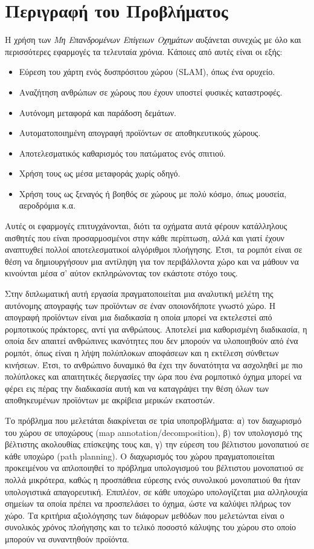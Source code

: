 \section{Περιγραφή του Προβλήματος}
\label{section:problem_description}

Η χρήση των \emph{Μη Επανδρομένων Επίγειων Οχημάτων} αυξάνεται συνεχώς με όλο και περισσότερες εφαρμογές τα τελευταία χρόνια. Κάποιες από αυτές είναι οι εξής:
\begin{itemize}
    \setlength\itemsep{-0.2em}
    \item Εύρεση του χάρτη ενός δυσπρόσιτου χώρου (SLAM), όπως ένα ορυχείο.
    \item Αναζήτηση ανθρώπων σε χώρους που έχουν υποστεί φυσικές καταστροφές.
    \item Αυτόνομη μεταφορά και παράδοση δεμάτων.
    \item Αυτοματοποιημένη απογραφή προϊόντων σε αποθηκευτικούς χώρους.
    \item Αποτελεσματικός καθαρισμός του πατώματος ενός σπιτιού.
    \item Χρήση τους ως μέσα μεταφοράς χωρίς οδηγό.
    \item Χρήση τους ως ξεναγός ή βοηθός σε χώρους με πολύ κόσμο, όπως μουσεία, αεροδρόμια κ.α.
\end{itemize}
Αυτές οι εφαρμογές επιτυγχάνονται, διότι τα οχήματα αυτά φέρουν κατάλληλους αισθητές που είναι προσαρμοσμένοι στην κάθε περίπτωση, αλλά και γιατί έχουν αναπτυχθεί πολλοί αποτελεσματικοί αλγόριθμοι πλοήγησης. Έτσι, τα ρομπότ είναι σε θέση να δημιουργήσουν μια αντίληψη για τον περιβάλλοντα χώρο και να μάθουν να κινούνται μέσα σ' αύτον εκπληρώνοντας τον εκάστοτε στόχο τους.

Στην διπλωματική αυτή εργασία πραγματοποιείται μια αναλυτική μελέτη της αυτόνομης απογραφής των προϊόντων σε έναν οποιονδήποτε γνωστό χώρο. Η απογραφή προϊόντων είναι μια διαδικασία η οποία μπορεί να εκτελεστεί από ρομποτικούς πράκτορες, αντί για ανθρώπους. Αποτελεί μια καθορισμένη διαδικασία, η οποία δεν απαιτεί ανθρώπινες ικανότητες που δεν μπορούν να υλοποιηθούν από ένα ρομπότ, όπως είναι η λήψη πολύπλοκων αποφάσεων και η εκτέλεση σύνθετων κινήσεων. Έτσι, το ανθρώπινο δυναμικό θα έχει την δυνατότητα να ασχοληθεί με πιο πολύπλοκες και απαιτητικές διεργασίες την ώρα που ένα ρομποτικό όχημα μπορεί να φέρει εις πέρας την διαδικασία αυτή και να καταγράψει την θέση όλων των αποθηκευμένων προϊόντων με ακρίβεια μερικών εκατοστών. 

Το πρόβλημα που μελετάται διακρίνεται σε τρία υποπροβλήματα: α) τον διαχωρισμό του χώρου σε υποχώρους (map annotation/decomposition), β) τον υπολογισμό της βέλτιστης ακολουθίας επίσκεψης τους και, γ) την εύρεση του βέλτιστου μονοπατιού σε κάθε υποχώρο (path planning). Ο διαχωρισμός του χώρου πραγματοποιείται προκειμένου να απλοποιηθεί το πρόβλημα υπολογισμού του βέλτιστου μονοπατιού σε πολλά μικρότερα, καθώς η προσπάθεια εύρεσης ενός συνολικού μονοπατιού θα ήταν υπολογιστικά απαγορευτική. Επιπλέον, σε κάθε υποχώρο υπολογίζεται μια αλληλουχία σημείων τα οποία πρέπει να προσπελάσει το όχημα, ώστε να καλύψει πλήρως τον χώρο. Τα κριτήρια αξιολόγησης των διάφορων μεθόδων που μελετώνται είναι ο συνολικός χρόνος πλοήγησης και το τελικό ποσοστό κάλυψης του χώρου στο οποίο μπορούν να συναντηθούν προϊόντα.

